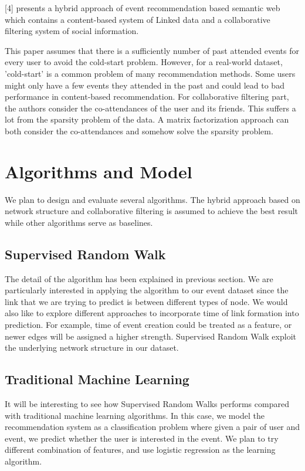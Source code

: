 \documentclass{article}
\begin{document}
[4] presents a hybrid approach of event recommendation based semantic web which contains a content-based system of Linked data and a collaborative filtering system of social information.

This paper assumes that there is a sufficiently number of past attended events for every user to avoid the cold-start problem. However, for a real-world dataset, 'cold-start' is a common problem of many recommendation methods. Some users might only have a few events they attended in the past and could lead to bad performance in content-based recommendation. For collaborative filtering part, the authors consider the co-attendances of the user and its friends. This suffers a lot from the sparsity problem of the data. A matrix factorization approach can both consider the co-attendances and somehow solve the sparsity problem. 





\section{Algorithms and Model}
We plan to design and evaluate several algorithms. The hybrid approach based on network structure and collaborative filtering is assumed to achieve the best result while other algorithms serve as baselines.

\subsection{Supervised Random Walk}
The detail of the algorithm has been explained in previous section. We are particularly interested in applying the algorithm to our event dataset since the link that we are trying to predict is between different types of node. We would also like to explore different approaches to incorporate time of link formation into prediction. For example, time of event creation could be treated as a feature, or newer edges will be assigned a higher strength. Supervised Random Walk exploit the underlying network structure in our dataset.

\subsection{Traditional Machine Learning}
It will be interesting to see how Supervised Random Walks performs compared with traditional machine learning algorithms. In this case, we model the recommendation system as a classification problem where given a pair of user and event, we predict whether the user is interested in the event. We plan to try different combination of features, and use logistic regression as the learning algorithm. 
\end{document}
